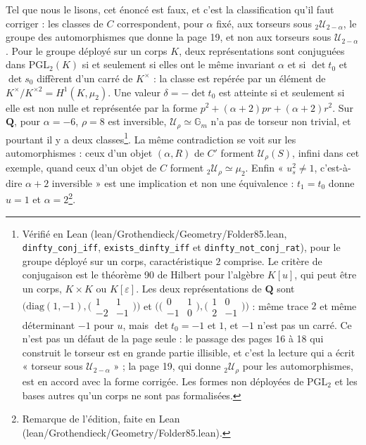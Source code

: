 \documentclass[11pt,a4paper]{article}
\begin{document}
Tel que nous le lisons, cet énoncé est faux, et c'est la classification qu'il
faut corriger : les classes de $C$ correspondent, pour $\alpha$ fixé, aux
torseurs sous ${}_2\mathcal{U}_{2-\alpha}$, le groupe des automorphismes que
donne la page 19, et non aux torseurs sous $\mathcal{U}_{2-\alpha}$. Pour le
groupe déployé sur un corps $K$, deux représentations sont conjuguées dans
$\mathrm{PGL}_2(K)$ si et seulement si elles ont le même invariant $\alpha$
et si $\det t_0$ et $\det s_0$ diffèrent d'un carré de $K^\times$ : la classe
est repérée par un élément de $K^\times/K^{\times 2} = H^1(K, \mu_2)$. Une
valeur $\delta = -\det t_0$ est atteinte si et seulement si elle est non nulle
et représentée par la forme $p^2 + (\alpha + 2)pr + (\alpha + 2)r^2$. Sur
$\mathbf{Q}$, pour $\alpha = -6$, $\rho = 8$ est inversible,
$\mathcal{U}_\rho \simeq \mathbb{G}_m$ n'a pas de torseur non trivial, et
pourtant il y a deux classes\footnote{Vérifié en Lean
(lean/Grothendieck/Geometry/Folder85.lean, \texttt{dinfty\_conj\_iff},
\texttt{exists\_dinfty\_iff} et \texttt{dinfty\_not\_conj\_rat}), pour le
groupe déployé sur un corps, caractéristique $2$ comprise. Le critère de
conjugaison est le théorème 90 de Hilbert pour l'algèbre $K[u]$, qui peut être
un corps, $K \times K$ ou $K[\varepsilon]$. Les deux représentations de
$\mathbf{Q}$ sont $\bigl(\mathrm{diag}(1, -1),
\bigl(\begin{smallmatrix} 1 & 1 \\ -2 & -1 \end{smallmatrix}\bigr)\bigr)$ et
$\bigl(\bigl(\begin{smallmatrix} 0 & 1 \\ -1 & 0 \end{smallmatrix}\bigr),
\bigl(\begin{smallmatrix} 1 & 0 \\ 2 & -1 \end{smallmatrix}\bigr)\bigr)$ : même
trace $2$ et même déterminant $-1$ pour $u$, mais $\det t_0 = -1$ et $1$, et
$-1$ n'est pas un carré. Ce n'est pas un défaut de la page seule : le passage
des pages 16 à 18 qui construit le torseur est en grande partie illisible, et
c'est la lecture qui a écrit « torseur sous $\mathcal{U}_{2-\alpha}$ » ; la
page 19, qui donne ${}_2\mathcal{U}_\rho$ pour les automorphismes, est en
accord avec la forme corrigée. Les formes non déployées de $\mathrm{PGL}_2$ et
les bases autres qu'un corps ne sont pas formalisées.}. La même contradiction
se voit sur les automorphismes : ceux d'un objet $(\alpha, R)$ de $C'$ forment
$\mathcal{U}_\rho(S)$, infini dans cet exemple, quand ceux d'un objet de $C$
forment ${}_2\mathcal{U}_\rho \simeq \mu_2$. Enfin « $u_s^2 \neq 1$,
c'est-à-dire $\alpha + 2$ inversible » est une implication et non une
équivalence : $t_1 = t_0$ donne $u = 1$ et $\alpha = 2$\footnote{Remarque de
l'édition, faite en Lean (lean/Grothendieck/Geometry/Folder85.lean).}.
\end{document}
